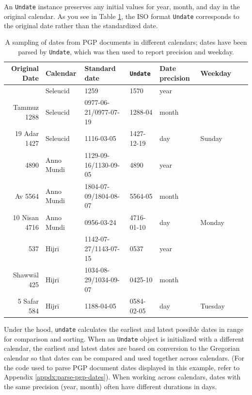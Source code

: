 \documentclass{anthology-ch}         %
\begin{document}
An \texttt{Undate} instance preserves any initial values for year, month, and day in the original calendar. As you see in Table \ref{tab:pgp-parsed-dates}, the ISO format \texttt{Undate} corresponds to the original date rather than the standardized date.

\begin{table}[h]
  \centering 
  \begin{tabular}{rlllllll}
    \toprule
Original Date & Calendar & Standard date & \texttt{Undate} & Date precision & Weekday \\ 
\midrule\addlinespace[2.5pt]
1570 & Seleucid & 1259 & 1570 & year &  \\
Tammuz 1288 & Seleucid & 0977-06-21/0977-07-19 & 1288-04 & month &  \\
19 Adar 1427 & Seleucid & 1116-03-05 & 1427-12-19 & day & Sunday \\
\midrule
4890 & Anno Mundi & 1129-09-16/1130-09-05 & 4890 & year &  \\
Av 5564 & Anno Mundi & 1804-07-09/1804-08-07 & 5564-05 & month &  \\
10 Nisan 4716 & Anno Mundi & 0956-03-24 & 4716-01-10 & day & Monday \\
\midrule
537 & Hijrī & 1142-07-27/1143-07-15 & 0537 & year &  \\
Shawwāl 425 & Hijrī & 1034-08-29/1034-09-07 & 0425-10 & month &  \\
5 Safar 584 & Hijrī & 1188-04-05 & 0584-02-05 & day & Tuesday \\
\bottomrule
    \bottomrule
  \end{tabular}
  \caption{A sampling of dates from PGP documents in different calendars; dates have been parsed by \texttt{Undate}, which was then used to report precision and weekday.}
  \label{tab:pgp-parsed-dates}
\end{table}

Under the hood, \texttt{undate} calculates the earliest and latest possible dates in range for comparison and sorting. When an \texttt{Undate} object is initialized with a different calendar, the earliest and latest dates are based on conversion to the Gregorian calendar so that dates can be compared and used together across calendars. (For the code used to parse PGP document dates displayed in this example, refer to Appendix \ref{appdx:parse-pgp-dates}). When working across calendars, dates with the same precision (year, month) often have different durations in days.
\end{document}
